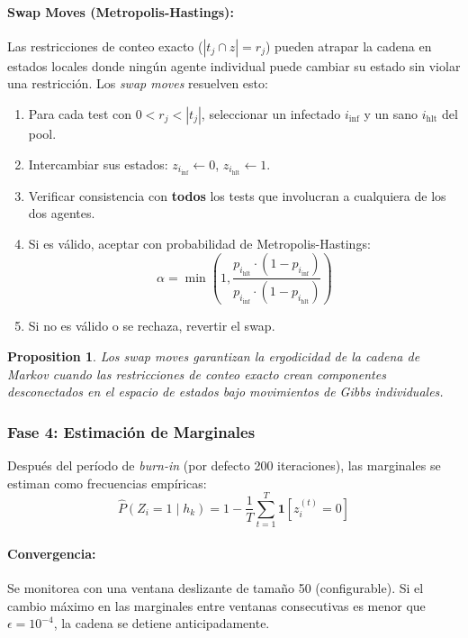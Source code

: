 \documentclass[11pt, a4paper]{article}
\newtheorem{proposition}{Proposition}
\begin{document}
\paragraph{Swap Moves (Metropolis-Hastings):}
Las restricciones de conteo exacto ($|t_j \cap z| = r_j$) pueden
atrapar la cadena en estados locales donde ning\'un agente individual
puede cambiar su estado sin violar una restricci\'on. Los \textit{swap
moves} resuelven esto:
\begin{enumerate}[nosep]
    \item Para cada test con $0 < r_j < |t_j|$, seleccionar un infectado
    $i_{\text{inf}}$ y un sano $i_{\text{hlt}}$ del pool.
    \item Intercambiar sus estados: $z_{i_\text{inf}} \leftarrow 0$,
    $z_{i_\text{hlt}} \leftarrow 1$.
    \item Verificar consistencia con \textbf{todos} los tests que
    involucran a cualquiera de los dos agentes.
    \item Si es v\'alido, aceptar con probabilidad de Metropolis-Hastings:
    \begin{equation}
        \alpha = \min\left(1, \frac{p_{i_\text{hlt}} \cdot (1 - p_{i_\text{inf}})}{
        p_{i_\text{inf}} \cdot (1 - p_{i_\text{hlt}})}\right)
    \end{equation}
    \item Si no es v\'alido o se rechaza, revertir el swap.
\end{enumerate}

\begin{proposition}
Los swap moves garantizan la ergodicidad de la cadena de Markov cuando
las restricciones de conteo exacto crean componentes desconectados en el
espacio de estados bajo movimientos de Gibbs individuales.
\end{proposition}

\subsubsection{Fase 4: Estimaci\'on de Marginales}
Despu\'es del per\'iodo de \textit{burn-in} (por defecto 200 iteraciones),
las marginales se estiman como frecuencias emp\'iricas:
\begin{equation}
    \hat{P}(Z_i = 1 \mid h_k) = 1 - \frac{1}{T} \sum_{t=1}^{T}
    \mathbf{1}[z_i^{(t)} = 0]
\end{equation}

\paragraph{Convergencia:} Se monitorea con una ventana deslizante de
tama\~no 50 (configurable). Si el cambio m\'aximo en las marginales entre
ventanas consecutivas es menor que $\epsilon = 10^{-4}$, la cadena se
detiene anticipadamente.
\end{document}
